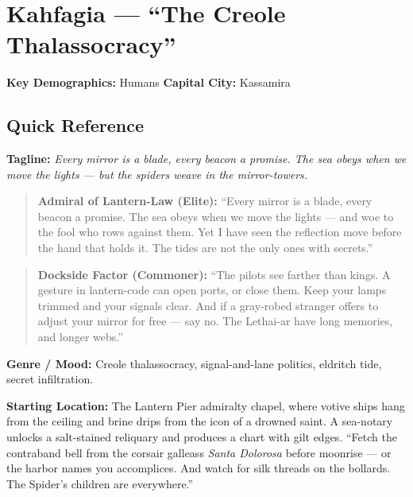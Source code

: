 \section{Kahfagia --- ``The Creole Thalassocracy''}
\label{chap:kahfagia}

\textbf{Key Demographics: } Humans
\textbf{Capital City: } Kassamira

\subsection*{Quick Reference}
\textbf{Tagline:} \textit{Every mirror is a blade, every beacon a promise. The sea obeys when we move the lights --- but the spiders weave in the mirror-towers.}

\begin{quote}
  \textbf{Admiral of Lantern-Law (Elite):}  
  ``Every mirror is a blade, every beacon a promise. The sea obeys when we move the lights --- and woe to the fool who rows against them. Yet I have seen the reflection move before the hand that holds it. The tides are not the only ones with secrets.''
\end{quote}

\begin{quote}
  \textbf{Dockside Factor (Commoner):}  
  ``The pilots see farther than kings. A gesture in lantern-code can open ports, or close them. Keep your lamps trimmed and your signals clear. And if a gray-robed stranger offers to adjust your mirror for free --- say no. The Lethai-ar have long memories, and longer webs.''
\end{quote}

\textbf{Genre / Mood:} Creole thalassocracy, signal-and-lane politics, eldritch tide, secret infiltration.

\textbf{Starting Location:} The Lantern Pier admiralty chapel, where votive ships hang from the ceiling and brine drips from the icon of a drowned saint. A sea-notary unlocks a salt-stained reliquary and produces a chart with gilt edges. ``Fetch the contraband bell from the corsair galleass \emph{Santa Dolorosa} before moonrise --- or the harbor names you accomplices. And watch for silk threads on the bollards. The Spider's children are everywhere.''

